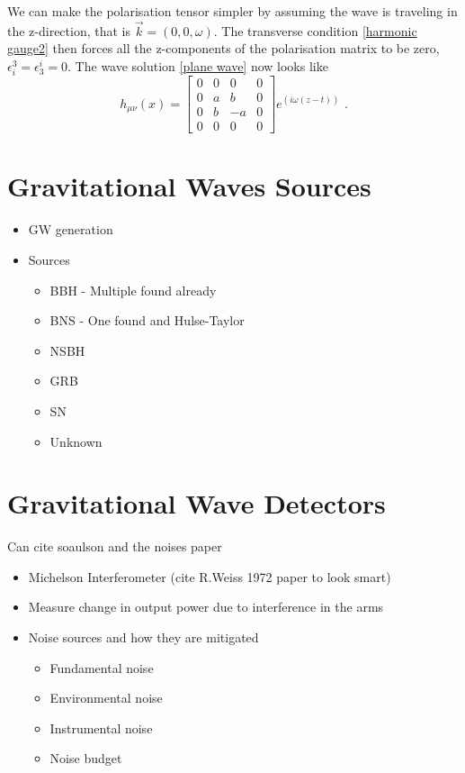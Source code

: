 \documentclass[12pt,twoside,a4paper]{report}
\newcommand{\mn}{_{\mu\nu}}
\newcommand{\fs}{\text{ .}}
\begin{document}
We can make the polarisation tensor simpler by assuming the wave is traveling in the z-direction, that is $\vec{k} = (0,0,\omega)$. The transverse condition \ref{harmonic gauge2} then forces all the z-components of the polarisation matrix to be zero, $\epsilon^3_i = \epsilon^i_3 = 0$. The wave solution \ref{plane wave} now looks like
\[
h\mn (x)
=
\begin{bmatrix}
0 & 0 & 0 & 0 \\
0 & a & b & 0 \\
0 & b & -a & 0 \\
0 & 0 & 0 & 0 
\end{bmatrix}
e^{(i\omega (z-t))} \fs
\] 

\newpage
\section{Gravitational Waves Sources} 
\begin{itemize}
\item GW generation 
\item Sources
\begin{itemize}
\item BBH - Multiple found already
\item BNS - One found and Hulse-Taylor
\item NSBH
\item GRB 
\item SN
\item Unknown
\end{itemize}
\end{itemize}
\section{Gravitational Wave Detectors} 
Can cite soaulson and the noises paper
\begin{itemize}
\item Michelson Interferometer (cite R.Weiss 1972 paper to look smart)
\item Measure change in output power due to interference in the arms
\item Noise sources and how they are mitigated
\begin{itemize}
\item Fundamental noise
\item Environmental noise
\item Instrumental noise
\item Noise budget
\end{itemize}
\end{itemize}
\end{document}
